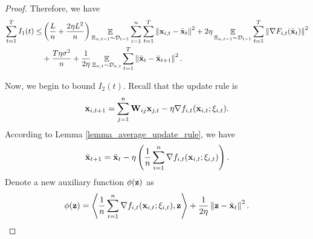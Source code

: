 \documentclass{article}
\begin{document}
\begin{proof}
Therefore, we have 
\begin{align}
\nonumber
\sum_{t=1}^T I_1(t) \le &  \left(  \frac{L}{n} + \frac{2\eta L^2}{n}  \right)\mathop{\mathbb{E}}_{ \Xi_{n,t-1} \sim \mathcal{D}_{t-1} }\sum_{i=1}^n\sum_{t=1}^T\left\lVert{\bf x}_{i,t} - \bar{{\bf x}}_t \right\rVert^2   + 2\eta  \mathop{\mathbb{E}}_{ \Xi_{n,t-1} \sim \mathcal{D}_{t-1} }\sum_{t=1}^T\left\lVert\nabla F_{i,t}(\bar{{\bf x}}_t)\right\rVert^2 \\ \nonumber 
&+ \frac{T\eta  \sigma^2}{n} +  \frac{1}{2\eta} \mathop{\mathbb{E}}_{ \Xi_{n,t} \sim \mathcal{D}_{n,t} }\sum_{t=1}^T\left\lVert \bar{{\bf x}}_t - \bar{{\bf x}}_{t+1}\right\rVert^2.
\end{align} 




Now, we begin to bound $I_2(t)$. Recall that the update rule is 
\begin{align}
\nonumber
{\bf x}_{i,t+1} = \sum_{j=1}^n {\bf W}_{ij}{\bf x}_{j,t} - \eta \nabla f_{i,t}({\bf x}_{i,t};\xi_{i,t}).
\end{align}  According to Lemma \ref{lemma_average_update_rule}, we have 
\begin{align}
\label{equa_thoerem_update_rule_equivalent}
\bar{{\bf x}}_{t+1} = \bar{{\bf x}}_t - \eta \left( \frac{1}{n}\sum_{i=1}^n \nabla f_{i,t}({\bf x}_{i,t};\xi_{i,t}) \right).
\end{align} 
Denote a new auxiliary function $\phi({\bf z})$ as 
\begin{align}
\nonumber
\phi({\bf z}) = \left\langle\frac{1}{n}\sum_{i=1}^n \nabla f_{i,t}({\bf x}_{i,t};\xi_{i,t}), {\bf z} \right\rangle + \frac{1}{2\eta}\left\lVert{\bf z} - \bar{{\bf x}}_t\right\rVert^2.
\end{align} 


\end{proof}
\end{document}
